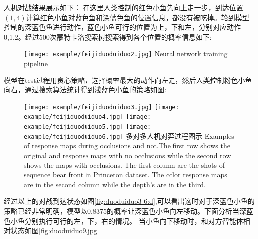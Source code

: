 人机对战结果展示如下：
在这里人类控制的红色小鱼先向上走一步，到达位置$(1,4)$计算红色小鱼对蓝色鱼和深蓝色鱼的位置信息，都没有被吃掉。轮到模型控制的深蓝色鱼进行动作，蓝色小鱼可行的位置为上，下和左，分别对应动作0,1,2。经过500次蒙特卡洛搜索树搜索得到各个位置的概率信息如下:
\begin{figure}[!htp]
	\centering
	\texttt{[image: example/feijiduoduiduo2.jpg]}
	{Neural network training pipeline}
	\label{duoduiduo2.png}
\end{figure}
模型在test过程用贪心策略，选择概率最大的动作向左走，然后人类控制粉色小鱼向右，通过搜索算法统计得到浅蓝色小鱼的策略如图:

\begin{figure}[!htp]
	\centering
	\subcaptionbox{\label{fig2:fig:duoduiduo3-6:a}}
	{\texttt{[image: example/feijiduoduiduo3.jpg]}}
	\hspace{0.5em}
	\subcaptionbox{\label{fig:duoduiduo3-6:b}}
	{\texttt{[image: example/feijiduoduiduo4.jpg]}}
	\newline
	\centering
	\subcaptionbox{\label{fig:duoduiduo3-6:c}}
	{\texttt{[image: example/feijiduoduiduo5.jpg]}}
	\hspace{0.5em}
	\subcaptionbox{\label{fig:duoduiduo3-6:d}}
	{\texttt{[image: example/feijiduoduiduo6.jpg]}}
	\bicaption
	{多对多人机对弈过程图示}
	{Examples of response maps during occlusions and not.The first row shows the original and response maps with no occlusions while the second row shows the maps with occlusions. The first column are the shots of sequence bear front in Princeton dataset. The color response maps are in the second column while the depth’s are in the third.}
	\label{fig:duoduiduo3-6}
\end{figure}

经过以上的对战到达状态如图\ref{fig:duoduiduo3-6:d},可以看出这时对于深蓝色小鱼的策略已经非常明确，模型以0.8375的概率让深蓝色小鱼向左移动。下面分析当深蓝色小鱼分别执行可行的左，下，右的情况。
当小鱼向下移动时，和对方智能体相对状态如图\ref{fig:duoduiduo9.jpg}



